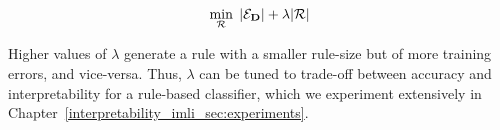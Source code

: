  \begin{equation}
  \label{interpretability_imli_eq:obj}
 \min\limits_{\mathcal{R}} \;  |\mathcal{E}_{\mathbf{D}}| +\lambda |\mathcal{R}|
 \end{equation}
 
Higher  values of $ \lambda $ generate a rule with a smaller rule-size but of more training errors, and vice-versa. Thus, $ \lambda $ can be tuned to trade-off between accuracy and interpretability for a rule-based classifier, which we experiment extensively in Chapter~\ref{interpretability_imli_sec:experiments}.


